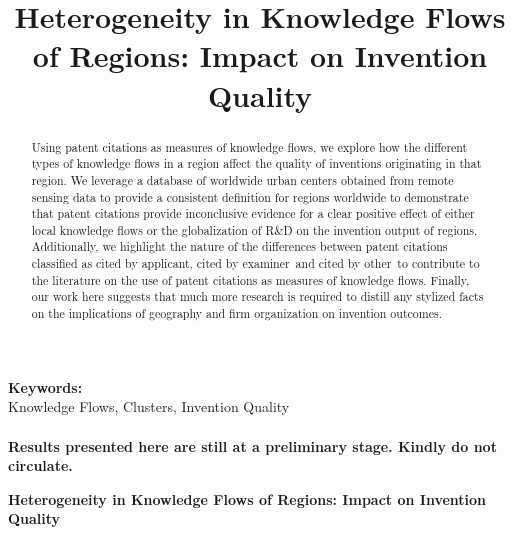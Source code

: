 \documentclass[12pt,letterpaper]{article}
\begin{document}
\setlength{\droptitle}{-5em}
\title{\textbf{\normalsize Heterogeneity in Knowledge Flows of Regions: Impact on Invention Quality}}
\date{\vspace{-12ex}}

\clearpage\maketitle
\thispagestyle{firstpage}

\renewcommand\abstractname{\textsc{ABSTRACT}}
\begin{abstract}
\normalsize
\noindent Using patent citations as measures of knowledge flows, we explore how the different types of knowledge flows in a region affect the quality of inventions originating in that region. We leverage a database of worldwide urban centers  obtained from remote sensing data to provide a consistent definition for regions worldwide to demonstrate that patent citations provide inconclusive evidence for a clear positive effect of either local knowledge flows or the globalization of R\&D on the invention output of regions. Additionally, we highlight the nature of the differences between patent citations classified as \textquotesingle cited by applicant\textquotesingle, \textquotesingle cited by examiner\textquotesingle \ and \textquotesingle cited by other\textquotesingle \ to contribute to the literature on the use of patent citations as measures of knowledge flows. Finally, our work here suggests that much more research is required to distill any stylized facts on the implications of geography and firm organization on invention outcomes. 
\end{abstract}

{\textbf{Keywords:} \\\indent Knowledge Flows, Clusters, Invention Quality\\\\}
\vspace{30ex}
\textbf{Results presented here are still at a preliminary stage. Kindly do not circulate.}
\newpage

\newpage
\begin{center}
\textbf{Heterogeneity in Knowledge Flows of Regions: Impact on Invention Quality}
\end{center}
\end{document}
